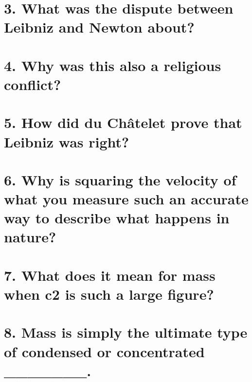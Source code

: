\section{3. What was the dispute between Leibniz and Newton about?}


\section{4. Why was this also a religious conflict?}
\section{5. How did du Châtelet prove that Leibniz was right?}
\section{6. Why is squaring the velocity of what you measure such an accurate way to describe
what happens in nature?}
\section{7. What does it mean for mass when c2 is such a large figure?}
\section{8. Mass is simply the ultimate type of condensed or concentrated _______.}
